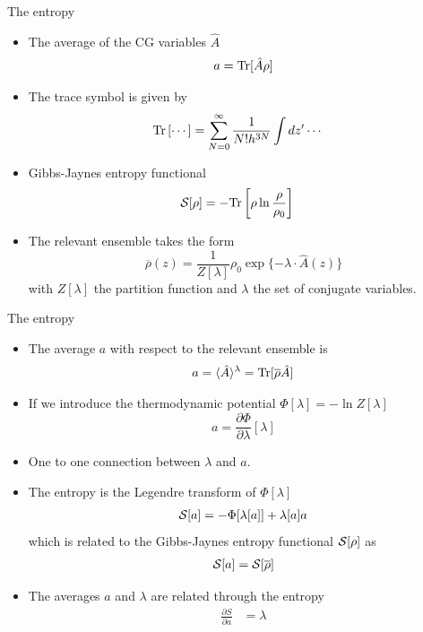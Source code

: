 \documentclass{beamer}
\begin{document}
\begin{frame}{The entropy}
  \begin{itemize}
    \item The average of the CG variables $\hat{A}$
  \begin{align}
    a = {\rm Tr}[{\hat{A}}\rho]
    \nonumber
\end{align}
  \item 
The trace symbol is given by
\begin{align}
  {\rm Tr}\left[\cdots\right]&=\sum_{N=0}^\infty \frac{1}{N!h^{3N}}
\int dz'\cdots
\nonumber
\end{align}
\item Gibbs-Jaynes entropy functional 
\begin{align}
 {\cal S}[\rho]&=-{\rm Tr}\left[\rho\ln\frac{\rho}{\rho_0}\right]
\nonumber
\end{align}
\item \alert{The relevant ensemble} takes the form
\begin{equation}
\overline{\rho}(z) = \frac{1}{Z[\lambda]} \rho_0\exp\{-\lambda\!\cdot\!\hat{A}(z)\}
\nonumber
\end{equation}
with $Z[\lambda]$ the partition function and $\lambda$ the set of conjugate variables.
\end{itemize}
\end{frame}

\begin{frame}{The entropy}
  \begin{itemize}
    \item The average $a$ with respect to the relevant ensemble is
   \begin{align}
  a =\langle \hat{A}\rangle^\lambda ={\rm Tr}[\overline{\rho}\hat{A}]
     \nonumber
\end{align}
\item If we introduce the thermodynamic potential $\Phi[\lambda]=-\ln Z[\lambda]$
\begin{equation}
a =\frac{\partial \Phi}{\partial
\lambda}[\lambda]
\nonumber
\end{equation}
\item One to one connection between $\lambda$ and $a$.
\item The entropy is the Legendre transform of $\Phi[\lambda]$
\begin{align}
  {\cal S}[a] =-\Phi[\lambda[a]]+\lambda[a] a
\nonumber
\end{align}
which is related to the Gibbs-Jaynes entropy functional ${\cal S}[\rho]$ as
  \begin{align}
{\cal S}[a]={\cal S}[\overline{\rho}]
\nonumber
\end{align}
\item The averages \alert{$a$ and $\lambda$ are related through the entropy}
\begin{align}
  \frac{\partial S}{\partial a}&=\lambda
\nonumber
\end{align}
    \end{itemize}
\end{frame}
\end{document}
